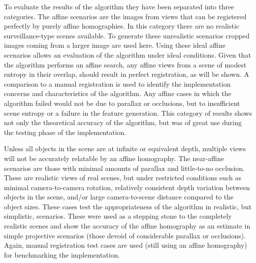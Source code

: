 %
%
%
%
%
%

%
%
%



To evaluate the results of the algorithm they have been separated into three categories. The affine scenarios are the images from views that can be registered perfectly by purely affine homographies. In this category there are no realistic surveillance-type scenes available. To generate these unrealistic scenarios cropped images coming from a larger image are used here. Using these ideal affine scenarios allows an evaluation of the algorithm under ideal conditions. Given that the algorithm performs an affine search, any affine views from a scene of modest entropy in their overlap, should result in perfect registration, as will be shown. A comparison to a manual registration is used to identify the implementation concerns and characteristics of the algorithm. Any affine cases in which the algorithm failed would not be due to parallax or occlusions, but to insufficient scene entropy or a failure in the feature generation. This category of results shows not only the theoretical accuracy of the algorithm, but was of great use during the testing phase of the implementation.

Unless all objects in the scene are at infinite or equivalent depth, multiple views will not be accurately relatable by an affine homography. The near-affine scenarios are those with minimal amounts of parallax and little-to-no occlusion. These are realistic views of real scenes, but under restricted conditions such as minimal camera-to-camera rotation, relatively consistent depth variation between objects in the scene, and/or large camera-to-scene distance compared to the object sizes. These cases test the appropriateness of the algorithm in realistic, but simplistic, scenarios. These were used as a stepping stone to the completely realistic scenes and show the accuracy of the affine homography as an estimate in simple projective scenarios (\ie { }those devoid of considerable parallax or occlusions). Again, manual registration test cases are used (still using an affine homography) for benchmarking the implementation.

